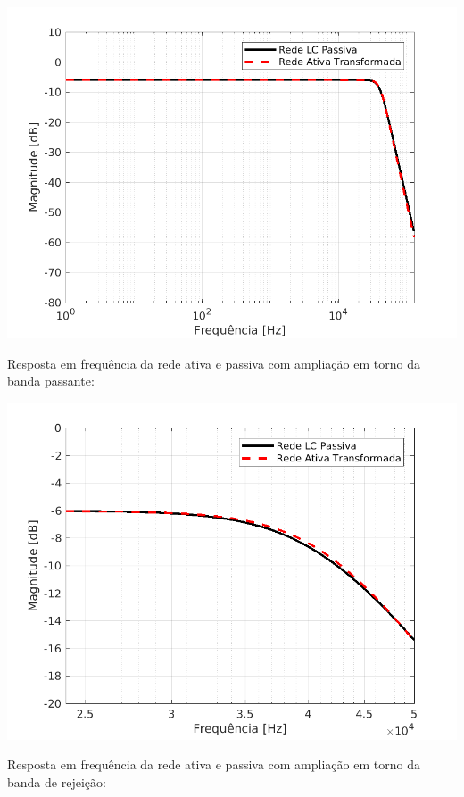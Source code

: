 \documentclass{article}
\begin{document}
\begin{center}
\centering
  \includegraphics[scale=0.7]{img/magnitude.png}
\end{center}

Resposta em frequência da rede ativa e passiva com ampliação em torno da banda passante:

\begin{center}
\centering
  \includegraphics[scale=0.7]{img/magnitudebandpass.png}
\end{center}

Resposta em frequência da rede ativa e passiva com ampliação em torno da banda de rejeição:
\end{document}
